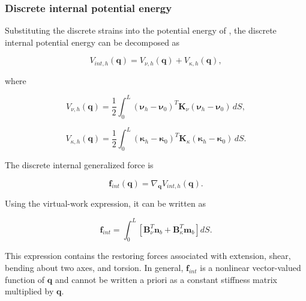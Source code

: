 \subsubsection{Discrete internal potential energy}\label{sec:galerkin-2-3-3}

Substituting the discrete strains into the potential energy of , the discrete internal potential energy can be decomposed as

\begin{equation}
\label{eq:galerkin-2-27}
V_{int,h}\left( \mathbf{q} \right) = V_{\nu,h}\left( \mathbf{q} \right) + V_{\kappa,h}\left( \mathbf{q} \right),
\end{equation}

where

\begin{equation}
\label{eq:galerkin-2-28}
V_{\nu,h}\left( \mathbf{q} \right) = \frac{1}{2}\int_{0}^{L}\left( \bm{\nu}_{h} - \bm{\nu}_{0} \right)^{T}\mathbf{K}_{\nu}\left( \bm{\nu}_{h} - \bm{\nu}_{0} \right)\, dS,
\end{equation}

\begin{equation}
\label{eq:galerkin-2-29}
V_{\kappa,h}\left( \mathbf{q} \right) = \frac{1}{2}\int_{0}^{L}\left( \bm{\kappa}_{h} - \bm{\kappa}_{0} \right)^{T}\mathbf{K}_{\kappa}\left( \bm{\kappa}_{h} - \bm{\kappa}_{0} \right)\, dS.
\end{equation}

The discrete internal generalized force is

\begin{equation}
\label{eq:galerkin-2-30}
\mathbf{f}_{int}\left( \mathbf{q} \right) = \nabla_{\mathbf{q}}V_{int,h}\left( \mathbf{q} \right).
\end{equation}

Using the virtual-work expression, it can be written as

\begin{equation}
\label{eq:galerkin-2-31}
\mathbf{f}_{int} = \int_{0}^{L}\left\lbrack \mathbf{B}_{\nu}^{T}\mathbf{n}_{b} + \mathbf{B}_{\kappa}^{T}\mathbf{m}_{b} \right\rbrack dS.
\end{equation}

This expression contains the restoring forces associated with extension, shear, bending about two axes, and torsion. In general, \(\mathbf{f}_{int}\) is a nonlinear vector-valued function of \(\mathbf{q}\) and cannot be written a priori as a constant stiffness matrix multiplied by \(\mathbf{q}\).

